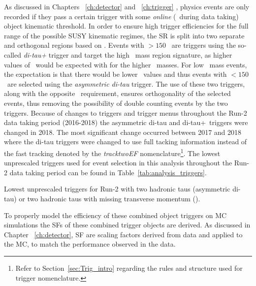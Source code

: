 	As discussed in Chapters ~\ref{ch:detector} and ~\ref{ch:trigger}	, physics events are only recorded if they pass a certain trigger with some \textit{online} (\ie\ during data taking) object kinematic threshold.
	In order to 	ensure high trigger efficiencies for the full range of the possible \ac{SUSY} kinematic regimes, the \ac{SR} is split into two separate and orthogonal regions based on \met. 
	Events with \met$>150$ \gev\ are triggers using the so-called \textit{di-tau+\met} trigger and target the high \stau\ mass region signature, as higher values of \met\ would be expected with for the higher \stau\ masses. For low \stau\ mass events, the expectation is that there would be lower \met\ values and thus events with \met$<150$ \gev\ are selected using the \textit{asymmetric di-tau} trigger.
	The use of these two triggers, along with the opposite \met\ requirement, ensures orthogonality of the selected events, thus removing the possibility of double counting events by the two triggers. 
	Because of changes to triggers and trigger menus throughout the Run-2 data taking period (2016-2018) the asymmetric di-tau and di-tau+\met\ triggers were changed in 2018.
	The most significant change occurred between 2017 and 2018 where the di-tau triggers were changed to use full tacking information instead of the fast tracking denoted by the \textit{tracktwoEF} nomenclature\footnote{Refer to Section~\ref{sec:Trig_intro} regarding the rules and structure used for trigger nomenclature.}.
	The lowest unprescaled triggers used for event selection in this analysis throughout the Run-2 data taking period can be found in Table~\ref{tab:analysis_triggers}.
	\begin{table}[!hbt]
	\centering
	\caption{Lowest unprescaled triggers for Run-2 with two hadronic taus (asymmetric di-tau) or two hadronic taus with missing transverse momentum (\met).}
		
	\label{tab:analysis_triggers}
	\end{table}
	
	To properly model the efficiency of these combined object triggers on \ac{MC} simulations the \acp{SF} of these combined trigger objects are derived.
	 As discussed in Chapter ~\ref{ch:detector}, \ac{SF} are scaling factors derived from data and applied to the \ac{MC}, to match the performance observed in the data. 
